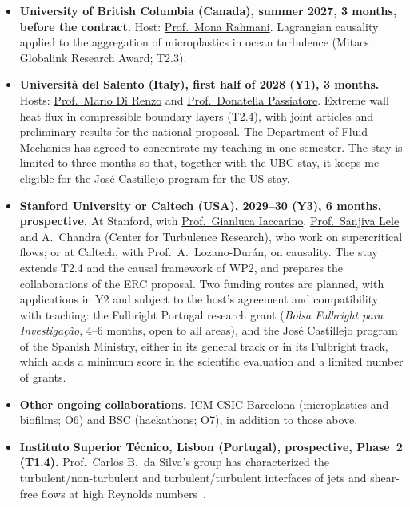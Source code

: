 \documentclass[11pt]{article}
\begin{document}
\begin{itemize}
  \item \textbf{University of British Columbia (Canada), summer 2027, 3 months, before the
  contract.} Host: \href{https://chbe.ubc.ca/mona-rahmani/}{Prof.\ Mona Rahmani}. Lagrangian
  causality applied to the aggregation of microplastics in ocean turbulence (Mitacs Globalink
  Research Award; T2.3).
  \item \textbf{Universit\`a del Salento (Italy), first half of 2028 (Y1), 3 months.} Hosts:
  \href{https://www.unisalento.it/scheda-utente/-/people/mario.direnzo}{Prof.\ Mario Di Renzo}
  and \href{https://www.unisalento.it/scheda-utente/-/people/donatella.passiatore}{Prof.\
  Donatella Passiatore}. Extreme wall heat flux in compressible boundary layers (T2.4), with
  joint articles and preliminary results for the national proposal. The Department of Fluid
  Mechanics has agreed to concentrate my teaching in one semester. The stay is limited to
  three months so that, together with the UBC stay, it keeps me eligible for the José
  Castillejo program for the US stay.
  \item \textbf{Stanford University or Caltech (USA), 2029--30 (Y3), 6 months,
  prospective.} At Stanford, with
  \href{https://me.stanford.edu/people/gianluca-iaccarino}{Prof.\ Gianluca Iaccarino},
  \href{https://me.stanford.edu/people/sanjiva-lele}{Prof.\ Sanjiva Lele} and A.\ Chandra
  (Center for Turbulence Research), who work on supercritical flows; or at Caltech, with
  Prof.\ A.\ Lozano-Dur\'an, on causality. The stay extends T2.4 and the causal framework of
  WP2, and prepares the collaborations of the ERC proposal. Two funding routes are planned,
  with applications in Y2 and subject to the host's agreement and compatibility with
  teaching: the Fulbright Portugal research grant (\emph{Bolsa Fulbright para
  Investiga\c{c}\~ao}, 4--6 months, open to all areas), and the José Castillejo program of the
  Spanish Ministry, either in its general track or in its Fulbright track, which adds a minimum
  score in the scientific evaluation and a limited number of grants.
  \item \textbf{Other ongoing collaborations.} ICM-CSIC Barcelona (microplastics and biofilms;
  O6) and BSC (hackathons; O7), in addition to those above.
  \item \textbf{Instituto Superior T\'ecnico, Lisbon (Portugal), prospective, Phase~2
  (T1.4).} Prof.\ Carlos B.\ da Silva's group has characterized the turbulent/non-turbulent and turbulent/turbulent
  interfaces of jets and shear-free flows at high Reynolds numbers~\cite{Silva2018,Alves2025}.

\end{itemize}
\end{document}
